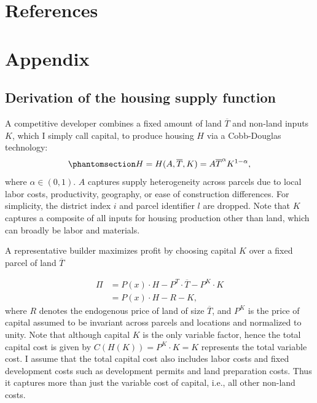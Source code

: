 \documentclass[
  12pt,
]{article}
\begin{document}
\newpage

\section*{References}\label{references}

\renewcommand{\bibsection}{}



\newpage

\section*{Appendix}\label{sec-appendix-hse}


\subsection{Derivation of the housing supply
function}\label{sec-hs-appendix}

A competitive developer combines a fixed amount of land \(\overline{T}\)
and non-land inputs \(K\), which I simply call capital, to produce
housing \(H\) via a Cobb-Douglas technology:
\begin{equation}\phantomsection\label{eq-cobb-appendix}{
H = H(A, \overline{T}, K) = A \overline{T}^{\alpha} K^{1-\alpha},
}\end{equation} where \(\alpha \in (0, 1)\). \(A\) captures supply
heterogeneity across parcels due to local labor costs, productivity,
geography, or ease of construction differences. For simplicity, the
district index \(i\) and parcel identifier \(l\) are dropped. Note that
\(K\) captures a composite of all inputs for housing production other
than land, which can broadly be labor and materials.

A representative builder maximizes profit by choosing capital \(K\) over
a fixed parcel of land \(\overline{T}\)

\[
\begin{aligned}
\Pi &= P(x) \cdot H - P^T \cdot \overline{T} - P^K\cdot K\\
&=P(x)\cdot H - R - K,
\end{aligned}
\] where \(R\) denotes the endogenous price of land of size
\(\overline{T}\), and \(P^K\) is the price of capital assumed to be
invariant across parcels and locations and normalized to unity. Note
that although capital \(K\) is the only variable factor, hence the total
capital cost is given by \(C(H(K)) = P^K\cdot K = K\) represents the
total variable cost. I assume that the total capital cost also includes
labor costs and fixed development costs such as development permits and
land preparation costs. Thus it captures more than just the variable
cost of capital, i.e., all other non-land costs.
\end{document}
